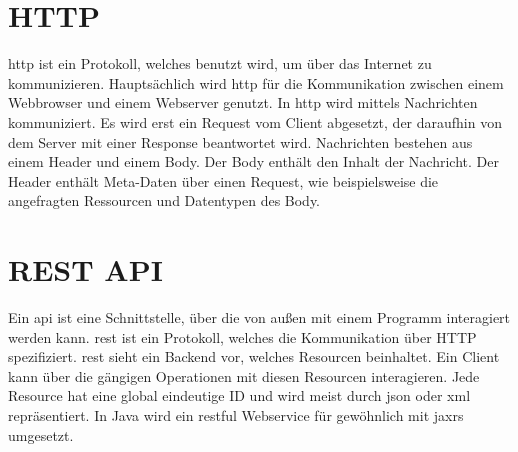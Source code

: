 \section{HTTP}
\label{sec:http}

\ac{http} ist ein Protokoll, welches benutzt wird, um über das Internet zu kommunizieren.
Hauptsächlich wird \ac{http} für die Kommunikation zwischen einem Webbrowser und einem Webserver genutzt.
In \ac{http} wird mittels Nachrichten kommuniziert.
Es wird erst ein Request vom Client abgesetzt, der daraufhin von dem Server mit einer Response beantwortet wird.
Nachrichten bestehen aus einem Header und einem Body.
Der Body enthält den Inhalt der Nachricht.
Der Header enthält Meta-Daten über einen Request, wie beispielsweise die angefragten Ressourcen und Datentypen des Body.

\section{REST API}
\label{sec:rest}

Ein \ac{api} ist eine Schnittstelle, über die von außen mit einem Programm interagiert werden kann.
\ac{rest} ist ein Protokoll, welches die Kommunikation über HTTP spezifiziert.
\ac{rest} sieht ein Backend vor, welches Resourcen beinhaltet.
Ein Client kann über die gängigen  Operationen mit diesen Resourcen interagieren.
Jede Resource hat eine global eindeutige ID und wird meist durch \ac{json} oder \ac{xml} repräsentiert.
In Java wird ein \ac{rest}ful Webservice für gewöhnlich mit \ac{jaxrs} umgesetzt.
~\autocite{schiesser:javaEE7}

